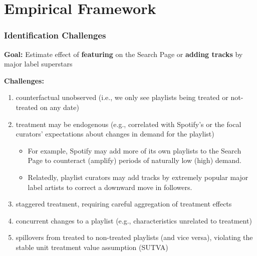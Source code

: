\documentclass[8pt]{beamer}
\begin{document}

\section{Empirical Framework}


\begin{frame}%

    \frametitle{Identification Challenges}
    
    \textbf{Goal:} Estimate effect of \textbf{featuring} on the Search Page or \textbf{adding tracks} by major label superstars
    \vspace{.5cm}

    \textbf{Challenges:}
    \begin{enumerate}
    \item counterfactual unobserved (i.e., we only see playlists being treated or not-treated on any date)
    \item treatment may be endogenous (e.g., correlated with Spotify's or the focal curators' expectations about changes in demand for the playlist)
    \begin{itemize}
        \item[$\rightarrow$] For example, Spotify may add more of its own playlists to the Search Page to counteract
        (amplify) periods of naturally low (high) demand. 
        \item[$\rightarrow$] Relatedly, playlist curators may add tracks by extremely popular major label artists to correct a downward move in followers.
    \end{itemize}
    \item staggered treatment, requiring careful aggregation of treatment effects \citep{baker2022much} 
    \item concurrent changes to a playlist (e.g., characteristics unrelated to treatment)
    \item spillovers from treated to non-treated playlists (and vice versa), violating the stable unit treatment value assumption (SUTVA) \citep{goldfarb2022conducting}
    \end{enumerate}
    
    \end{frame}

    
\end{document}

